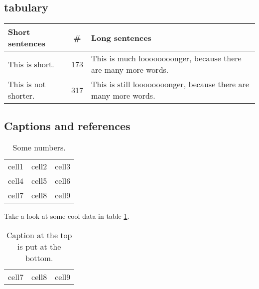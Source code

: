 \documentclass{article}
\begin{document}
  \subsection{tabulary}

  \begin{center}
    \begin{tabulary}{0.7\textwidth}{LCL}
      Short sentences      & \#  & Long sentences                                                 \\
      \hline
      This is short.       & 173 & This is much loooooooonger, because there are many more words.  \\
      This is not shorter. & 317 & This is still loooooooonger, because there are many more words. \\
    \end{tabulary}
  \end{center}

  \subsection{Captions and references}

  \begin{table}[h]
    \begin{tabular}{ c c c }
       cell1 & cell2 & cell3 \\
       cell4 & cell5 & cell6 \\
       cell7 & cell8 & cell9
    \end{tabular}
    \caption{Some numbers.}
    \label{table:1}
  \end{table}

  Take a look at some cool data in table \ref{table:1}.

  \begin{table}[h]
    \caption{Caption at the top is put at the bottom.}
    \begin{tabular}{ c c c }
       cell7 & cell8 & cell9
    \end{tabular}
  \end{table}
\end{document}
